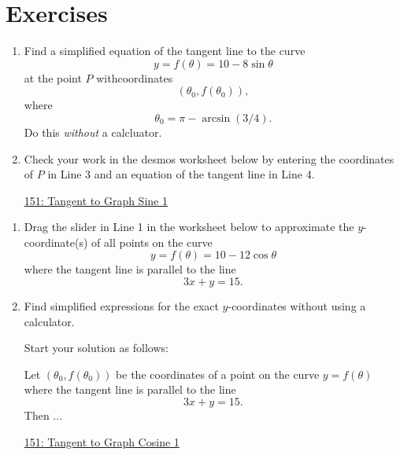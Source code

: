 \documentclass{ximera}
\begin{document}
\section{Exercises}

\begin{exercise} \label{Pf3mma}
\begin{enumerate}

\item Find a simplified equation of the tangent line to the curve
\[
      y = f(\theta) =  10 - 8\sin\theta
\]
at the point $P$ withcoordinates
\[
      (\theta_0 , f(\theta_0)),
\]
where
\[
    \theta_0 = \pi - \arcsin(3/4) .
\]
Do this \emph{without} a calcluator.

\item Check your work in the desmos worksheet below by entering the coordinates of $P$ in Line 3 and an equation of the tangent line in Line 4.

\begin{onlineOnly}
    \begin{center}
\end{center}
\end{onlineOnly}

\href{https://www.desmos.com/calculator/sizljkxbth}{151: Tangent to Graph Sine 1}
\end{enumerate}
\end{exercise}

\begin{exercise} \label{ExLm383}
\begin{enumerate}
\item Drag the slider in Line 1 in the worksheet below to approximate the $y$-coordinate(s) of all points on the curve
\[
    y = f(\theta) = 10 - 12\cos \theta
\] 
where the tangent line is parallel to the line
\[
  3x + y = 15.
\]

\item Find simplified expressions for the exact $y$-coordinates without using a calculator. 

Start your solution as follows:

Let $(\theta_0,f(\theta_0))$ be the coordinates of a point on the curve $y=f(\theta)$ where the tangent line is parallel to the line 
\[
      3x + y = 15.
\]
Then ...


\begin{onlineOnly}
    \begin{center}
\end{center}
\end{onlineOnly}

\href{https://www.desmos.com/calculator/8zwsudnvn0}{151: Tangent to Graph Cosine 1}


\end{enumerate}
\end{exercise}
\end{document}
